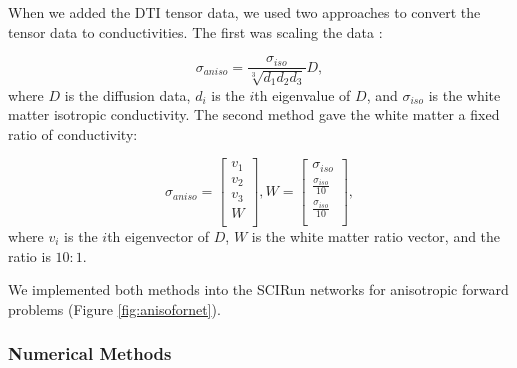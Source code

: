 When we added the DTI tensor data, we used two approaches to convert the tensor data to conductivities. The first was scaling the data \cite{ref:scaling}: 

\begin{equation}
\label{eq:scaling}
\sigma_{aniso} = \frac{\sigma_{iso}}{\sqrt[3]{d_1d_2d_3}}D,
\end{equation}
where $D$ is the diffusion data, $d_i$ is the $i$th eigenvalue of $D$, and $\sigma_{iso}$ is the white matter isotropic conductivity. The second method gave the white matter a fixed ratio of conductivity:

\begin{equation}
\label{eq:fixed}
\sigma_{aniso} = \begin{bmatrix}
v_1\\
v_2\\
v_3\\
W\\
\end{bmatrix}, 
W = \begin{bmatrix}
\sigma_{iso}\\
\frac{\sigma_{iso}}{10}\\
\frac{\sigma_{iso}}{10}\\
\end{bmatrix},
\end{equation}
where $v_i$ is the $i$th eigenvector of $D$, $W$ is the white matter ratio vector, and the ratio is $10:1$.

We implemented both methods into the SCIRun networks for anisotropic forward problems (Figure \ref{fig:anisofornet}). 

\subsubsection{Numerical Methods}
\label{sec:numerical}


